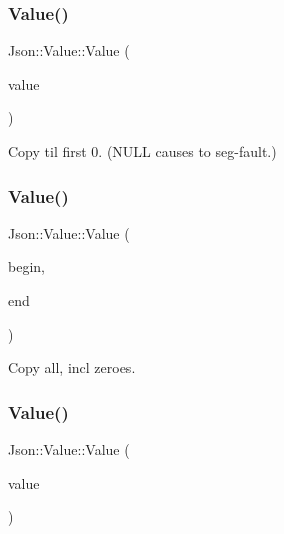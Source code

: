\subsubsection{\texorpdfstring{Value()}{Value()}\hspace{0.1cm}{\footnotesize\ttfamily [19/24]}}
{\footnotesize\ttfamily Json\+::\+Value\+::\+Value (\begin{DoxyParamCaption}\item[{const char $\ast$}]{value }\end{DoxyParamCaption})}



Copy til first 0. (N\+U\+LL causes to seg-\/fault.) 

\hypertarget{class_json_1_1_value_a39fa09d1902efbd4350e1236db920571}{}\label{class_json_1_1_value_a39fa09d1902efbd4350e1236db920571} 
\subsubsection{\texorpdfstring{Value()}{Value()}\hspace{0.1cm}{\footnotesize\ttfamily [20/24]}}
{\footnotesize\ttfamily Json\+::\+Value\+::\+Value (\begin{DoxyParamCaption}\item[{const char $\ast$}]{begin,  }\item[{const char $\ast$}]{end }\end{DoxyParamCaption})}



Copy all, incl zeroes. 

\hypertarget{class_json_1_1_value_a081830e95f88a37054da7e46c65b0766}{}\label{class_json_1_1_value_a081830e95f88a37054da7e46c65b0766} 
\subsubsection{\texorpdfstring{Value()}{Value()}\hspace{0.1cm}{\footnotesize\ttfamily [21/24]}}
{\footnotesize\ttfamily Json\+::\+Value\+::\+Value (\begin{DoxyParamCaption}\item[{const \hyperlink{class_json_1_1_static_string}{Static\+String} \&}]{value }\end{DoxyParamCaption})}



